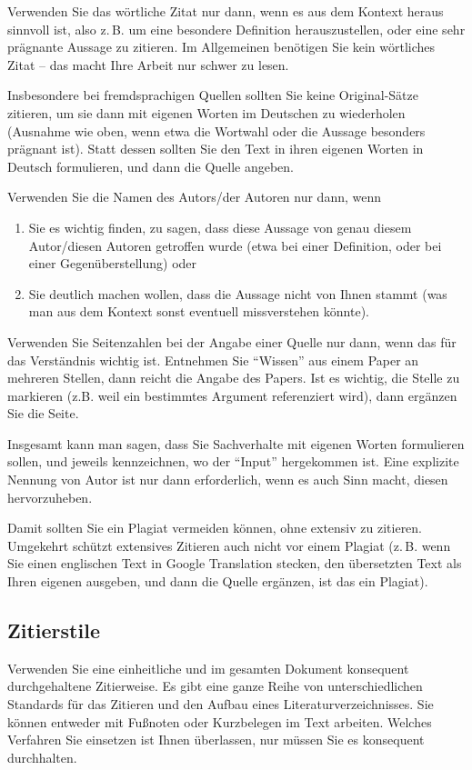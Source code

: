 \documentclass[conference,compsoc,final,a4paper]{IEEEtran}
\begin{document}
Verwenden Sie das wörtliche Zitat nur dann, wenn es aus dem Kontext heraus sinnvoll ist, also z.\,B. um eine besondere Definition herauszustellen, oder eine sehr prägnante Aussage zu zitieren. Im Allgemeinen benötigen Sie kein wörtliches Zitat -- das macht Ihre Arbeit nur schwer zu lesen.

Insbesondere bei fremdsprachigen Quellen sollten Sie keine Original-Sätze zitieren, um sie dann mit eigenen Worten im Deutschen zu wiederholen (Ausnahme wie oben, wenn etwa die Wortwahl oder die Aussage besonders prägnant ist). Statt dessen sollten Sie den Text in ihren eigenen Worten in Deutsch formulieren, und dann die Quelle angeben.

Verwenden Sie die Namen des Autors/der Autoren nur dann, wenn

\begin{enumerate}
\item Sie es wichtig finden, zu sagen, dass diese Aussage von genau diesem Autor/diesen Autoren getroffen wurde (etwa bei einer Definition, oder bei einer Gegenüberstellung) oder
\item Sie deutlich machen wollen, dass die Aussage nicht von Ihnen stammt (was man aus dem Kontext sonst eventuell missverstehen könnte).
\end{enumerate}

Verwenden Sie Seitenzahlen bei der Angabe einer Quelle nur dann, wenn das für das Verständnis wichtig ist. Entnehmen Sie \enquote{Wissen} aus einem Paper an mehreren Stellen, dann reicht die Angabe des Papers. Ist es wichtig, die Stelle zu markieren (z.B. weil ein bestimmtes Argument referenziert wird), dann ergänzen Sie die Seite.

Insgesamt kann man sagen, dass Sie Sachverhalte mit eigenen Worten formulieren sollen, und jeweils kennzeichnen, wo der \enquote{Input} hergekommen ist. Eine explizite Nennung von Autor ist nur dann erforderlich, wenn es auch Sinn macht, diesen hervorzuheben.

Damit sollten Sie ein Plagiat vermeiden können, ohne extensiv zu zitieren. Umgekehrt schützt extensives Zitieren auch nicht vor einem Plagiat (z.\,B. wenn Sie einen englischen Text in Google Translation stecken, den übersetzten Text als Ihren eigenen ausgeben, und dann die Quelle ergänzen, ist das ein Plagiat).

\subsection{Zitierstile}
Verwenden Sie eine einheitliche und im gesamten Dokument konsequent durchgehaltene Zitierweise. Es gibt eine ganze Reihe von unterschiedlichen Standards für das Zitieren und den Aufbau eines Literaturverzeichnisses. Sie können entweder mit Fußnoten oder Kurzbelegen im Text arbeiten. Welches Verfahren Sie einsetzen ist Ihnen überlassen, nur müssen Sie es konsequent durchhalten.
\end{document}
